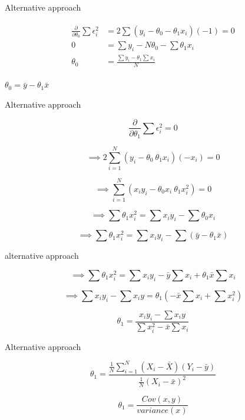 \documentclass{beamer}
\begin{document}
\begin{frame}{Alternative approach}

\begin{align}
    \begin{split}
        \frac{\partial}{\partial \theta_{0}}\sum \epsilon_{i}^{2} &= 2\sum(y_{i} -  \theta_{0} - \theta_{1}x_{i})(-1) = 0 \\
        0 &= \sum y_{i} -  N\theta_{0} - \sum \theta_{1}x_{i}\\
        \theta_{0} &= \frac{\sum y_{i} - \theta_{1}\sum x_{i}}{N}
    \end{split}
\end{align}


\begin{tcolorbox}
\begin{center}
    $ \theta_{0} = \bar{y} - \theta_{1} \bar{x}$
\end{center}
\end{tcolorbox}
\end{frame}
\begin{frame}{Alternative approach}

$$
\frac{\partial}{\partial \theta_{1}}\sum \epsilon_{i}^{2} = 0
$$


$$
\implies 2 \sum_{i=1}^{N} (y_{i} - \theta_{0} \ \theta_{1}x_{i})(-x_{i}) = 0
$$

$$
\implies \sum_{i=1}^{N} (x_{i}y_{i} - \theta_{0}x_{i} \ \theta_{1}x_{i}^{2}) = 0
$$

$$
\implies \sum  \theta_{1}x_{i}^{2} = \sum x_{i}y_{i} - \sum \theta_{0}x_{i}
$$

$$
\implies \sum  \theta_{1}x_{i}^{2} = \sum x_{i}y_{i} - \sum (\bar{y} - \theta_{1}\bar{x})
$$


\end{frame}

\begin{frame}{alternative approach}


$$
\implies \sum  \theta_{1}x_{i}^{2} = \sum x_{i}y_{i} - \bar{y}\sum x_{i} + \theta_{1}\bar{x}\sum x_{i} 
$$

$$
\implies \sum  
x_{i}y_{i} - \sum x_{i}y = \theta_{1} (-\bar{x}\sum x_{i} + \sum x_{i}^{2})
$$

$$
\theta_{1} = \frac{x_{i}y_{i} - \sum x_{i}y}{\sum x_{i}^{2} -\bar{x}\sum x_{i}}
$$

    
\end{frame}

\begin{frame}{Alternative approach}
    
    $$
    \theta_{1} = \frac{ \frac{1}{N} \sum_{i=1}^{N}(X_{i} - \bar{X})(Y_{i} - \bar{y})}{\frac{1}{N}(X_{i} - \bar{x})^{2}}
    $$
    
    \begin{tcolorbox}
    
    $$
    \theta_{1} = \frac{Cov(x,y)}{variance(x)}
    $$
    \end{tcolorbox}
\end{frame}
        
\end{document}
